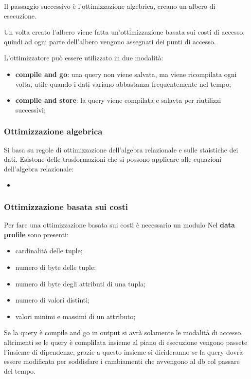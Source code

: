 \documentclass[12pt]{article}
\begin{document}
Il passaggio successivo \`e l'ottimizzazione algebrica, creano un albero di esecuzione.

Un volta creato l'albero viene fatta un'ottimizzazione basata sui costi di accesso, quindi ad ogni parte dell'albero vengono assegnati dei punti di accesso.


L'ottimizzatore pu\`o essere utilizzato in due modalit\`a:
\begin{itemize}
    \item \textbf{compile and go}: una query non viene salvata, ma viene ricompilata ogni volta, utile quando i dati variano abbastanza frequentemente nel tempo;
    \item \textbf{compile and store}: la query viene compilata e salavta per riutilizzi successivi;
\end{itemize}


\subsubsection{Ottimizzazione algebrica}
Si basa su regole di ottimizzazione dell'algebra relazionale e sulle staistiche dei dati. Esistone delle trasformazioni che si possono applicare alle equazioni dell'algebra relazionale:
\begin{itemize}
    \item 
\end{itemize}

\subsubsection{Ottimizzazione basata sui costi}
Per fare una ottimizzazione basata sui costi \`e necessario un modulo Nel \textbf{data profile} sono presenti:
\begin{itemize}
    \item cardinalit\`a delle tuple;
    \item numero di byte delle tuple;
    \item numero di byte degli attributi di una tupla;
    \item numero di valori distinti;
    \item valori minimi e massimi di un attributo;
\end{itemize}
Se la query \`e compile and go in output si avr\`a solamente le modalit\`a di accesso, altrimenti se le query \`e complilata insieme al piano di esecuzione vengono passete l'insieme di dipendenze, grazie a questo insieme si dicideranno se la query dovr\`a essere modificata per soddisfare i cambiamenti che avvengono al db col passare del tempo.
\end{document}
